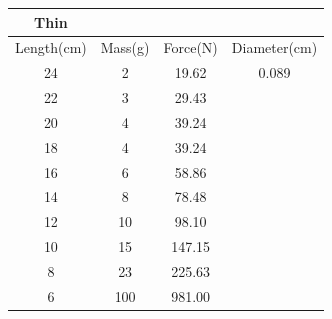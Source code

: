 \documentclass{article}
\begin{document}
\centering
\begin{tabular}{|| c | c | c | c ||}
 \hline
 Thin &\ &\ &\ \\
 \hline
 Length(cm) & Mass(g) & Force(N) & Diameter(cm) \\
 \hline
 \hline
 24 & 2 & 19.62 & 0.089\\
 22 & 3 & 29.43 &\ \\
 20 & 4 & 39.24 &\ \\
 18 & 4 & 39.24 &\ \\
 16 & 6 & 58.86 &\ \\
 14 & 8 & 78.48 &\ \\
 12 & 10 & 98.10 &\ \\
 10 & 15 & 147.15 &\ \\
 8 & 23 & 225.63 &\ \\
 6 & 100 & 981.00 &\ \\
 \hline
\end{tabular}
\end{document}
